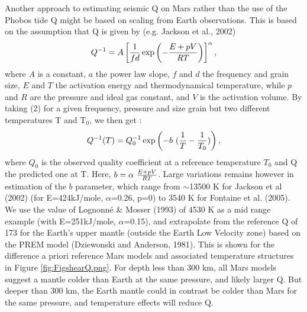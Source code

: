 
Another approach to estimating seismic Q on Mars rather than the use of the Phobos tide Q might be based on scaling from Earth observations. This is based on the assumption that Q is given by (e.g. Jackson et al., 2002)
\begin{equation}
Q^{-1}=A\left[ { 1 \over f d}\exp\left(-{E+pV \over RT}\right)\right]^{\alpha},
\end{equation}
where $A$ is a constant, $a$ the power law slope, $f$ and $d$ the frequency and grain size, $E$ and $T$ the activation energy and thermodynamical temperature, while $p$ and $R$ are the pressure and ideal gas constant, and $V$ is the activation volume. By taking (2) for a given frequency, pressure and size grain but two different temperatures T and T$_0$, we then get :
\begin{equation}
Q^{-1}(T) = Q_0^{-1}\exp\left(-b \ ({1 \over T} - {1 \over T_0})\right) ,
\end{equation}
where $Q_0$ is the observed quality coefficient at a reference temperature $T_0$ and Q the predicted one at T. Here, $b=\alpha \ {E+pV \over RT}$.
 Large variations remains however in estimation of the $b$ parameter, which range from $\sim$13500 K for Jackson et al (2002) (for E=424kJ/mole, $\alpha$=0.26, p=0) to 3540 K for Fontaine et al. (2005). We use the value of Lognonn\'{e} \& Mosser (1993) of 4530 K as a mid range example (with E=251kJ/mole, $\alpha$=0.15), and extrapolate from the reference Q of 173 for the Earth's upper mantle (outside the Earth Low Velocity zone) based on the PREM model (Dziewonski and Anderson, 1981). This is shown for the difference a priori reference Mars models and associated temperature structures in Figure \ref{fig:FigshearQ.png}. For depth less than 300 km, all Mars models suggest a mantle colder than Earth at the same pressure, and likely larger Q. But deeper than 300 km, the Earth mantle could in contrast be colder than Mars for the same pressure, and temperature effects will reduce Q.

